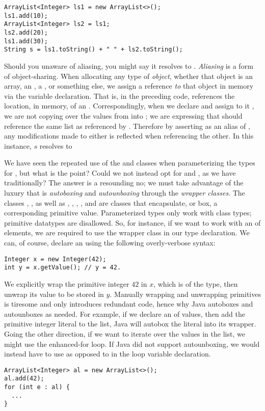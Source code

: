 \begin{verbatim}
ArrayList<Integer> ls1 = new ArrayList<>();
ls1.add(10);
ArrayList<Integer> ls2 = ls1;
ls2.add(20);
ls1.add(30);
String s = ls1.toString() + " " + ls2.toString();
\end{verbatim}
Should you unaware of aliasing, you might say it resolves to . \textit{Aliasing} is a form of object-sharing. When allocating any type of \textit{object}, whether that object is an array, an , a , or something else, we assign a reference \textit{to} that object in memory via the variable declaration. That is, in the preceding code,  references the location, in memory, of an . Correspondingly, when we declare  and assign to it , we are not copying over the values from  into ; we are expressing that  should reference the same list as referenced by . Therefore by asserting  as an alias of , any modifications made to either is reflected when referencing the other. In this instance, $s$ resolves to 

We have seen the repeated use of the  and  classes when parameterizing the types for , but what is the point? Could we not instead opt for  and , as we have traditionally? The answer is a resounding no; we must take advantage of the luxury that is \textit{autoboxing} and \textit{autounboxing} through the \textit{wrapper classes}. The classes , , as well as , , , , and  are classes that encapsulate, or box, a corresponding primitive value. Parameterized types only work with class types; primitive datatypes are disallowed. So, for instance, if we want to work with an  of  elements, we are required to use the  wrapper class in our type declaration. We can, of course, declare an  using the following overly-verbose syntax:
\begin{verbatim}
Integer x = new Integer(42);
int y = x.getValue(); // y = 42.
\end{verbatim}
We explicitly wrap the primitive integer $42$ in $x$, which is of the  type, then unwrap its value to be stored in $y$. Manually wrapping and unwrapping primitives is tiresome and only introduces redundant code, hence why Java autoboxes and autounboxes as needed. For example, if we declare an  of  values, then add the primitive integer literal  to the list, Java will autobox the literal into its  wrapper. Going the other direction, if we want to iterate over the values in the list, we might use the enhanced-for loop. If Java did not support autounboxing, we would instead have to use  as opposed to  in the loop variable declaration. 
\begin{verbatim}
ArrayList<Integer> al = new ArrayList<>();
al.add(42);
for (int e : al) {
  ...
}
\end{verbatim}

